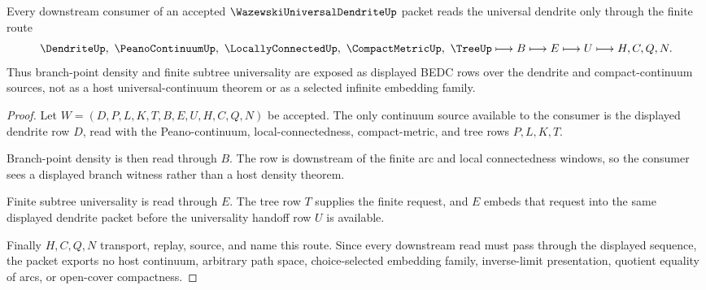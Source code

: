 
\begin{theorem}
\label{thm:wazewski-universal-dendrite-branch-universality-handoff}
Every downstream consumer of an accepted $\WazewskiUniversalDendriteUp$ packet reads the universal dendrite only through the finite route
$$
\DendriteUp,\ \PeanoContinuumUp,\ \LocallyConnectedUp,\ \CompactMetricUp,\ \TreeUp
\longmapsto B \longmapsto E \longmapsto U \longmapsto H,C,Q,N .
$$
Thus branch-point density and finite subtree universality are exposed as displayed BEDC rows over the dendrite and compact-continuum sources, not as a host universal-continuum theorem or as a selected infinite embedding family.
\end{theorem}
\begin{proof}
Let $W=(D,P,L,K,T,B,E,U,H,C,Q,N)$ be accepted. The only continuum source available to the consumer is the displayed dendrite row $D$, read with the Peano-continuum, local-connectedness, compact-metric, and tree rows $P,L,K,T$.

Branch-point density is then read through $B$. The row is downstream of the finite arc and local connectedness windows, so the consumer sees a displayed branch witness rather than a host density theorem.

Finite subtree universality is read through $E$. The tree row $T$ supplies the finite request, and $E$ embeds that request into the same displayed dendrite packet before the universality handoff row $U$ is available.

Finally $H,C,Q,N$ transport, replay, source, and name this route. Since every downstream read must pass through the displayed sequence, the packet exports no host continuum, arbitrary path space, choice-selected embedding family, inverse-limit presentation, quotient equality of arcs, or open-cover compactness.
\end{proof}



